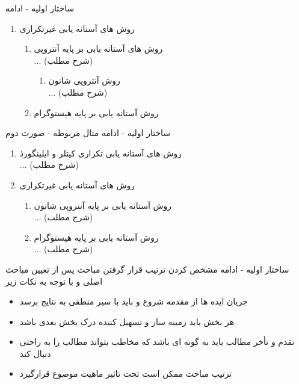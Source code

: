 \documentclass[12pt]{beamer}
\makeatletter
\newcommand{\rtlist}{\raggedleft\rightskip\@totalleftmargin}
\newcommand{\frametitlefontsize}{\fontsize{20pt}{0pt}\selectfont}
\makeatother
\begin{document}
\begin{persian}
\begin{frame}{\frametitlefontsize ساختار اولیه - ادامه}
\begin{enumerate}
			\item روش های آستانه یابی غیرتکراری
			\begin{enumerate}\rtlist
				\item روش های آستانه یابی بر پایه آنتروپی
				\\ ... (شرح مطلب)
				\begin{enumerate}\rtlist
					\item روش آنتروپی شانون
					\\ ... (شرح مطلب)
				\end{enumerate}
				
				\item روش آستانه یابی بر پایه هیستوگرام
			\end{enumerate}
		\end{enumerate}
	\end{frame}
	
	\begin{frame}{\frametitlefontsize ساختار اولیه - ادامه}
		مثال مربوطه - صورت دوم
		\begin{enumerate}\rtlist
			\item روش های آستانه یابی تکراری کیتلر و ایلینگورذ
			\\ ... (شرح مطلب)
			
			\item روش های آستانه یابی غیرتکراری
			\begin{enumerate}\rtlist
				\item روش آستانه یابی بر پایه آنتروپی شانون
				\\ ... (شرح مطلب)
				
				\item روش آستانه یابی بر پایه هیستوگرام
				\\ ... (شرح مطلب)				
			\end{enumerate}
		\end{enumerate}
	\end{frame}
	
	\begin{frame}{\frametitlefontsize ساختار اولیه - ادامه}
		مشخص کردن ترتیب قرار گرفتن مباحث پس از تعیین مباحث اصلی و با توجه به نکات زیر
		
		\begin{itemize}\rtlist
			\item جریان ایده ها از مقدمه شروع و باید با سیر منطقی به نتایج برسد
			\item هر بخش باید زمینه ساز و تسهیل کننده درک بخش بعدی باشد 
			\item تقدم و تأخر مطالب باید به گونه ای باشد که مخاطب بتواند مطالب را به راحتی دنبال کند 
			\item ترتیب مباحث ممکن است تحت تاثیر ماهیت موضوع قرارگیرد
		\end{itemize}
	\end{frame}
	

\end{persian}
\end{document}
